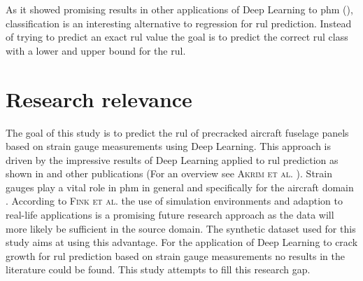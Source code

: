 \documentclass[conference]{IEEEtran}
\begin{document}

As it showed promising results in other applications of Deep Learning to \gls{phm} (\cite{Liu2019a, Xiao2016}), classification is an interesting alternative to regression for \gls{rul} prediction. Instead of trying to predict an exact \gls{rul} value the goal is to predict the correct \gls{rul} class with a lower and upper bound for the \gls{rul}.

\section{Research relevance}
\label{sec:research-relevance}

The goal of this study is to predict the \gls{rul} of precracked aircraft fuselage panels based on strain gauge measurements using Deep Learning. This approach is driven by the impressive results of Deep Learning applied to \gls{rul} prediction as shown in \cite{Xu2018, Li2018, Liu2019, Yuan2016, Wu2018, Park2020} and other publications (For an overview see \textsc{Akrim et al.} \cite{Akrim2021}). Strain gauges play a vital role in \gls{phm} in general \cite{Tinga2019} and specifically for the aircraft domain \cite{Timothy2009}. According to \textsc{Fink et al.} \cite{Fink2020} the use of simulation environments and adaption to real-life applications is a promising future research approach as the data will more likely be sufficient in the source domain. The synthetic dataset used for this study aims at using this advantage. For the application of Deep Learning to crack growth for \gls{rul} prediction based on strain gauge measurements no results in the literature could be found. This study attempts to fill this research gap.


\printbibliography
\end{document}
